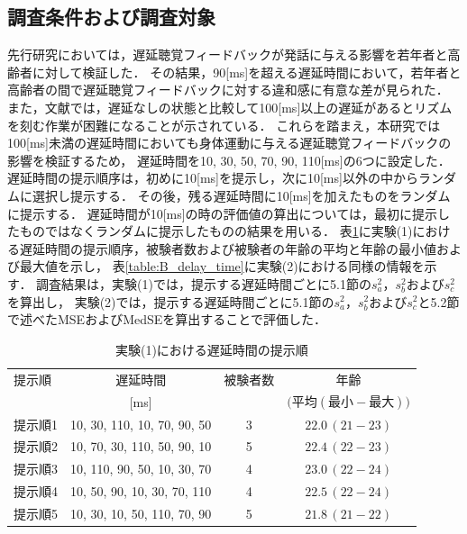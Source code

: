 \subsection{調査条件および調査対象}
\label{subsec:Yobi-conditions}
先行研究\cite{kayama}においては，遅延聴覚フィードバックが発話に与える影響を若年者と高齢者に対して検証した．
その結果，90[ms]を超える遅延時間において，若年者と高齢者の間で遅延聴覚フィードバックに対する違和感に有意な差が見られた．
また，文献\cite{timing-music}では，遅延なしの状態と比較して100[ms]以上の遅延があるとリズムを刻む作業が困難になることが示されている．
これらを踏まえ，本研究では100[ms]未満の遅延時間においても身体運動に与える遅延聴覚フィードバックの影響を検証するため，
遅延時間を10, 30, 50, 70, 90, 110[ms]の6つに設定した．遅延時間の提示順序は，初めに10[ms]を提示し，次に10[ms]以外の中からランダムに選択し提示する．
その後，残る遅延時間に10[ms]を加えたものをランダムに提示する．
遅延時間が10[ms]の時の評価値の算出については，最初に提示したものではなくランダムに提示したものの結果を用いる．
表\ref{table:A_delay_time}に実験(1)における遅延時間の提示順序，被験者数および被験者の年齢の平均と年齢の最小値および最大値を示し，
表\ref{table:B_delay_time}に実験(2)における同様の情報を示す．
調査結果は，実験(1)では，提示する遅延時間ごとに5.1節の$s^2_{a}$，$s^2_{b}$および$s^2_{c}$を算出し，
実験(2)では，提示する遅延時間ごとに5.1節の$s^2_{a}$，$s^2_{b}$および$s^2_{c}$と5.2節で述べたMSEおよびMedSEを算出することで評価した．
\begin{table}[tbp]
  \caption{実験(1)における遅延時間の提示順}
  \label{table:A_delay_time}
  \centering
  \begin{tabular}{lccc}
    \hline
    提示順 & 遅延時間 & 被験者数 & 年齢\\
    　& [ms] & & $\bigl(平均 (最小-最大)\bigr)$\\
    \hline \hline
    提示順1  & 10, 30, 110, 10, 70, 90, 50  & 3 & $22.0\, (21-23)$\\
    提示順2  & 10, 70, 30, 110, 50, 90, 10  & 5 & $22.4\, (22-23)$\\
    提示順3  & 10, 110, 90, 50, 10, 30, 70  & 4 & $23.0\, (22-24)$\\
    提示順4  & 10, 50, 90, 10, 30, 70, 110  & 4 & $22.5\, (22-24)$\\
    提示順5  & 10, 30, 10, 50, 110, 70, 90  & 5 & $21.8\, (21-22)$
\\
    \hline
  \end{tabular}
\end{table}

